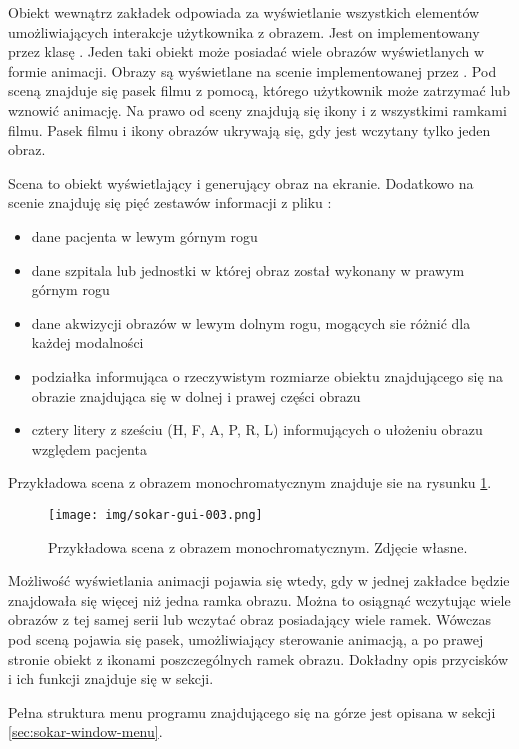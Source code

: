 \par
Obiekt wewnątrz zakładek odpowiada za wyświetlanie wszystkich elementów umożliwiających interakcje użytkownika z obrazem.
Jest on implementowany przez klasę .
Jeden taki obiekt może posiadać wiele obrazów wyświetlanych w formie animacji.
Obrazy są wyświetlane na scenie implementowanej przez .
Pod sceną znajduje się pasek filmu z pomocą, którego użytkownik może zatrzymać lub wznowić animację.
Na prawo od sceny znajdują się ikony i z wszystkimi ramkami filmu.
Pasek filmu i ikony obrazów ukrywają się, gdy jest wczytany tylko jeden obraz.
\par
Scena to obiekt wyświetlający i generujący obraz na ekranie.
Dodatkowo na scenie znajduję się pięć zestawów informacji z pliku \DICOM:
\begin{itemize}
    \item dane pacjenta w lewym górnym rogu
    \item dane szpitala lub jednostki w której obraz został wykonany w prawym górnym rogu
    \item dane akwizycji obrazów w lewym dolnym rogu, mogących sie różnić dla każdej modalności
    \item podziałka informująca o rzeczywistym rozmiarze obiektu znajdującego się na obrazie znajdująca się w dolnej i prawej części obrazu
    \item cztery litery z sześciu (H, F, A, P, R, L) informujących o ułożeniu obrazu względem pacjenta
\end{itemize}
Przykładowa scena z obrazem monochromatycznym znajduje sie na rysunku \ref{fig:sokar-gui-scene}.

\begin{figure}[!htbp]
    \centering
    \texttt{[image: img/sokar-gui-003.png]}
    \caption{Przykładowa scena z obrazem monochromatycznym. Zdjęcie własne.}
    \label{fig:sokar-gui-scene}
\end{figure}

\par
Możliwość wyświetlania animacji pojawia się wtedy, gdy w jednej zakładce będzie znajdowała się więcej niż jedna ramka obrazu.
Można to osiągnąć wczytując wiele obrazów z tej samej serii lub wczytać obraz posiadający wiele ramek.
Wówczas pod sceną pojawia się pasek, umożliwiający sterowanie animacją, a po prawej stronie obiekt z ikonami poszczególnych ramek obrazu.
Dokładny opis przycisków i ich funkcji znajduje się w sekcji.
\par
Pełna struktura menu programu znajdującego się na górze jest opisana w sekcji \ref{sec:sokar-window-menu}.
